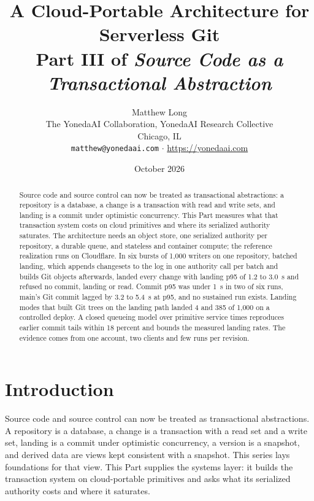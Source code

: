 \documentclass[11pt,letterpaper]{article}
\title{A Cloud-Portable Architecture for Serverless Git\\[4pt]
  {\normalsize Part III of \emph{Source Code as a Transactional Abstraction}}}
\author{Matthew Long\\
  \small The YonedaAI Collaboration, YonedaAI Research Collective\\
  \small Chicago, IL\\
  \small \texttt{matthew@yonedaai.com} $\cdot$ \url{https://yonedaai.com}}
\date{October 2026}
\theoremstyle{definition}
\theoremstyle{remark}
\begin{document}
\maketitle

\begin{abstract}
Source code and source control can now be treated as transactional abstractions: a repository is a database, a change is a transaction with read and write sets, and landing is a commit under optimistic concurrency. This Part measures what that transaction system costs on cloud primitives and where its serialized authority saturates. The architecture needs an object store, one serialized authority per repository, a durable queue, and stateless and container compute; the reference realization runs on Cloudflare.
In six bursts of 1,000 writers on one repository, batched landing, which appends changesets to the log in one authority call per batch and builds Git objects afterwards, landed every change with landing p95 of 1.2 to 3.0~s and refused no commit, landing or read. %
Commit p95 was under 1~s in two of six runs, main's Git commit lagged by 3.2 to 5.4~s at p95, and no sustained run exists. %
Landing modes that built Git trees on the landing path landed 4 and 385 of 1,000 on a controlled deploy. %
A closed queueing model over primitive service times reproduces earlier commit tails within 18 percent and bounds the measured landing rates. The evidence comes from one account, two clients and few runs per revision.
\end{abstract}

\section{Introduction}
\label{sec:sgoc:intro}

Source code and source control can now be treated as transactional abstractions. A repository is a database, a change is a transaction with a read set and a write set, landing is a commit under optimistic concurrency, a version is a snapshot, and derived data are views kept consistent with a snapshot. This series lays foundations for that view. This Part supplies the systems layer: it builds the transaction system on cloud-portable primitives and asks what its serialized authority costs and where it saturates.
\end{document}
